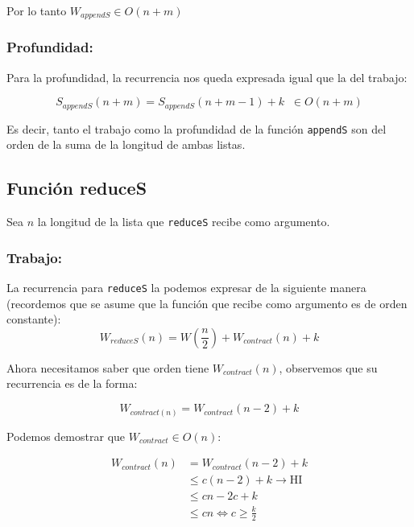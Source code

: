 \documentclass[11pt]{article}
\begin{document}
Por lo tanto $W_{appendS} \in O(n + m)$ \\

\subsubsection{Profundidad:}

Para la profundidad, la recurrencia nos queda expresada igual que la del
trabajo:

\begin{equation*}
    S_{appendS}(n + m) = S_{appendS}(n + m - 1) + k \; \; \in O(n + m)
\end{equation*}

Es decir, tanto el trabajo como la profundidad de la función \texttt{appendS}
son del orden de la suma de la longitud de ambas listas.


\subsection{Función reduceS}
Sea $n$ la longitud de la lista que \texttt{reduceS} recibe como argumento.
\subsubsection{Trabajo:}

La recurrencia para \texttt{reduceS} la podemos expresar de la siguiente manera
(recordemos que se asume que la función que recibe como argumento es de orden constante):
\begin{equation*}
    W_{reduceS}(n) = W(\frac{n}{2}) + W_{contract}(n) + k
\end{equation*}

Ahora necesitamos saber que orden tiene $W_{contract}(n)$, observemos que su 
recurrencia es de la forma:

\begin{equation*}
    W_{contract(n)} = W_{contract}(n-2) + k 
\end{equation*}

Podemos demostrar que $W_{contract} \in O(n)$:

\begin{align*}
    W_{contract}(n) & = W_{contract}(n - 2) + k \\
             & \leq c(n - 2) + k \rightarrow \text{HI}\\
             & \leq cn - 2c + k \\
             & \leq cn \iff c \geq \frac{k}{2}
\end{align*}
\end{document}
